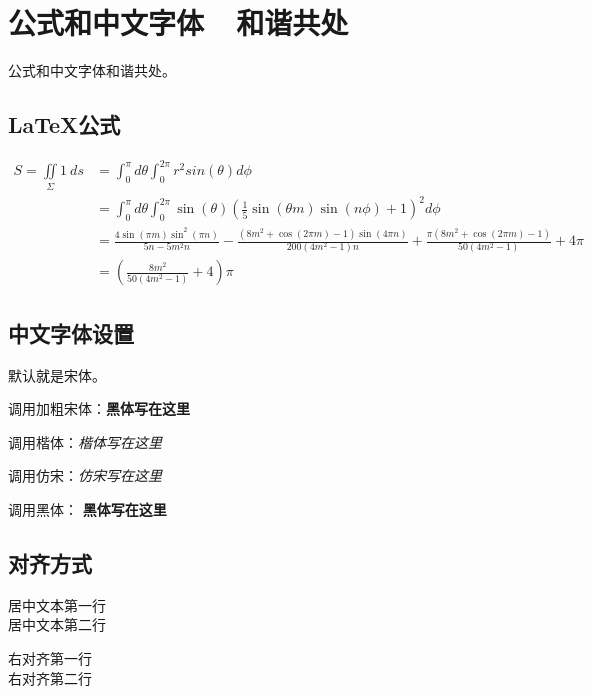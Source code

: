 \section{公式和中文字体\ \ 和谐共处}

公式和中文字体和谐共处。

\subsection{LaTeX公式}

\begin{align*}
S=\iint\limits_{\Sigma}1 \ ds &= \int_0^{\pi}d\theta \int_0^{2\pi} r^2sin(\theta) d\phi \\
&= \int_0^{\pi}d\theta \int_0^{2\pi}\sin (\theta ) \left(\frac{1}{5} \sin (\theta  m) \sin (n \phi )+1\right)^2d\phi\\
&=\frac{4 \sin (\pi  m) \sin ^2(\pi  n)}{5 n-5 m^2 n}-\frac{\left(8 m^2+\cos (2 \pi  m)-1\right) \sin (4 \pi  n)}{200 \left(4 m^2-1\right) n}+\frac{\pi  \left(8 m^2+\cos (2 \pi  m)-1\right)}{50 \left(4 m^2-1\right)}+4 \pi\\
&=  \left(\frac{8 m^2}{50 \left(4 m^2-1\right)}+4\right)\pi
\end{align*}

\subsection{中文字体设置}


默认就是宋体。


调用加粗宋体：\textbf{黑体写在这里}

调用楷体：\textit{楷体写在这里}

调用仿宋：\textsl{仿宋写在这里}

调用黑体： \textbf {黑体写在这里}


\subsection{对齐方式}


\begin{center} 
居中文本第一行\\
居中文本第二行\\
\end{center}

\begin{flushright}
右对齐第一行\\
右对齐第二行\\
\end{flushright}



